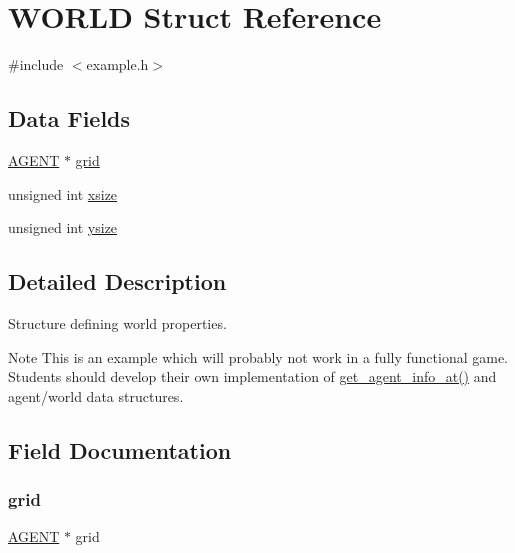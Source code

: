 \hypertarget{struct_w_o_r_l_d}{}\section{W\+O\+R\+LD Struct Reference}
\label{struct_w_o_r_l_d}


{\ttfamily \#include $<$example.\+h$>$}

\subsection*{Data Fields}
\begin{DoxyCompactItemize}
\item 
\mbox{\hyperlink{struct_a_g_e_n_t}{A\+G\+E\+NT}} $\ast$ \mbox{\hyperlink{struct_w_o_r_l_d_acdcf107a975cb6984d03082d5060586d}{grid}}
\item 
unsigned int \mbox{\hyperlink{struct_w_o_r_l_d_aa4b0263c533c5ce471067bd5ede24477}{xsize}}
\item 
unsigned int \mbox{\hyperlink{struct_w_o_r_l_d_a7e7fdb6b4d76fd619024da6878c27d58}{ysize}}
\end{DoxyCompactItemize}


\subsection{Detailed Description}
Structure defining world properties.

\begin{DoxyNote}{Note}
This is an example which will probably not work in a fully functional game. Students should develop their own implementation of \mbox{\hyperlink{showworld_8h_aa7881dde0e99af6e6576a7401f3c4586}{get\+\_\+agent\+\_\+info\+\_\+at()}} and agent/world data structures. 
\end{DoxyNote}


\subsection{Field Documentation}
\mbox{\label{struct_w_o_r_l_d_acdcf107a975cb6984d03082d5060586d}} 
\subsubsection{\texorpdfstring{grid}{grid}}
{\footnotesize\ttfamily \mbox{\hyperlink{struct_a_g_e_n_t}{A\+G\+E\+NT}} $\ast$ grid}

